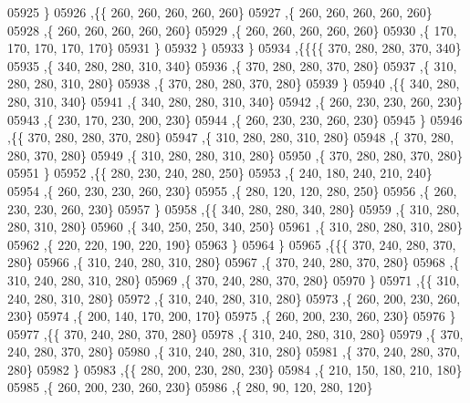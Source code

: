 \begin{DoxyCode}
05925     \}
05926    ,\{\{   260,   260,   260,   260,   260\}
05927     ,\{   260,   260,   260,   260,   260\}
05928     ,\{   260,   260,   260,   260,   260\}
05929     ,\{   260,   260,   260,   260,   260\}
05930     ,\{   170,   170,   170,   170,   170\}
05931     \}
05932    \}
05933   \}
05934  ,\{\{\{\{   370,   280,   280,   370,   340\}
05935     ,\{   340,   280,   280,   310,   340\}
05936     ,\{   370,   280,   280,   370,   280\}
05937     ,\{   310,   280,   280,   310,   280\}
05938     ,\{   370,   280,   280,   370,   280\}
05939     \}
05940    ,\{\{   340,   280,   280,   310,   340\}
05941     ,\{   340,   280,   280,   310,   340\}
05942     ,\{   260,   230,   230,   260,   230\}
05943     ,\{   230,   170,   230,   200,   230\}
05944     ,\{   260,   230,   230,   260,   230\}
05945     \}
05946    ,\{\{   370,   280,   280,   370,   280\}
05947     ,\{   310,   280,   280,   310,   280\}
05948     ,\{   370,   280,   280,   370,   280\}
05949     ,\{   310,   280,   280,   310,   280\}
05950     ,\{   370,   280,   280,   370,   280\}
05951     \}
05952    ,\{\{   280,   230,   240,   280,   250\}
05953     ,\{   240,   180,   240,   210,   240\}
05954     ,\{   260,   230,   230,   260,   230\}
05955     ,\{   280,   120,   120,   280,   250\}
05956     ,\{   260,   230,   230,   260,   230\}
05957     \}
05958    ,\{\{   340,   280,   280,   340,   280\}
05959     ,\{   310,   280,   280,   310,   280\}
05960     ,\{   340,   250,   250,   340,   250\}
05961     ,\{   310,   280,   280,   310,   280\}
05962     ,\{   220,   220,   190,   220,   190\}
05963     \}
05964    \}
05965   ,\{\{\{   370,   240,   280,   370,   280\}
05966     ,\{   310,   240,   280,   310,   280\}
05967     ,\{   370,   240,   280,   370,   280\}
05968     ,\{   310,   240,   280,   310,   280\}
05969     ,\{   370,   240,   280,   370,   280\}
05970     \}
05971    ,\{\{   310,   240,   280,   310,   280\}
05972     ,\{   310,   240,   280,   310,   280\}
05973     ,\{   260,   200,   230,   260,   230\}
05974     ,\{   200,   140,   170,   200,   170\}
05975     ,\{   260,   200,   230,   260,   230\}
05976     \}
05977    ,\{\{   370,   240,   280,   370,   280\}
05978     ,\{   310,   240,   280,   310,   280\}
05979     ,\{   370,   240,   280,   370,   280\}
05980     ,\{   310,   240,   280,   310,   280\}
05981     ,\{   370,   240,   280,   370,   280\}
05982     \}
05983    ,\{\{   280,   200,   230,   280,   230\}
05984     ,\{   210,   150,   180,   210,   180\}
05985     ,\{   260,   200,   230,   260,   230\}
05986     ,\{   280,    90,   120,   280,   120\}

\end{DoxyCode}
